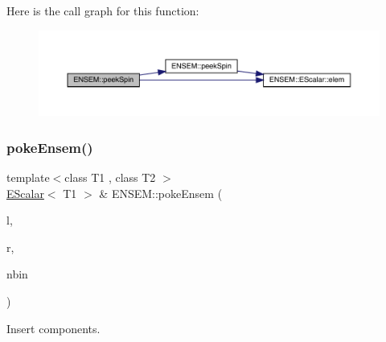Here is the call graph for this function\+:
\nopagebreak
\begin{figure}[H]
\begin{center}
\leavevmode
\includegraphics[width=350pt]{d4/dca/group__escalar_gadd6441efc37438418dda6c0e5a501f10_cgraph}
\end{center}
\end{figure}
\mbox{\label{group__escalar_ga9528137f2a0461bf8dc2e6825f00464f}} 
\subsubsection{\texorpdfstring{pokeEnsem()}{pokeEnsem()}}
{\footnotesize\ttfamily template$<$class T1 , class T2 $>$ \\
\mbox{\hyperlink{classENSEM_1_1EScalar}{E\+Scalar}}$<$ T1 $>$ \& E\+N\+S\+E\+M\+::poke\+Ensem (\begin{DoxyParamCaption}\item[{\mbox{\hyperlink{classENSEM_1_1EScalar}{E\+Scalar}}$<$ T1 $>$ \&}]{l,  }\item[{const \mbox{\hyperlink{classENSEM_1_1EScalar}{E\+Scalar}}$<$ T2 $>$ \&}]{r,  }\item[{int}]{nbin }\end{DoxyParamCaption})\hspace{0.3cm}{\ttfamily [inline]}}



Insert components. 

